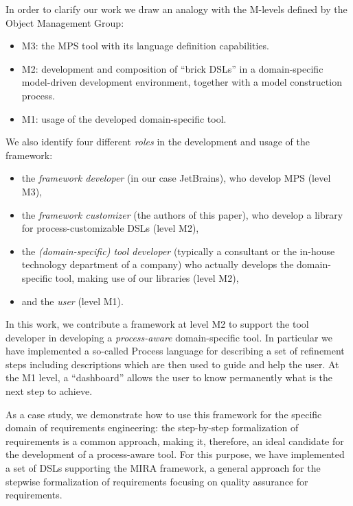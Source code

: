 In order to clarify our work we draw an analogy with the M-levels defined by the Object Management Group:
\vspace{-.1cm}
\begin{itemize}
  \item M3: the MPS tool with its language definition capabilities.
  \item M2: development and composition of ``brick DSLs'' in a
  domain-specific model-driven development environment, together with a
  model construction process.
  \item M1: usage of the developed domain-specific tool.
\end{itemize}
We also identify four different \emph{roles} in the development and
usage of the framework:
\vspace{-.1cm}
\begin{itemize}
  \item the \emph{framework developer} (in our case JetBrains), who develop MPS
  (level M3),
  \item the \emph{framework customizer} (the authors of this paper), who develop
  a library for process-customizable DSLs (level M2),
  \item the \emph{(domain-specific) tool developer} 
    (typically a consultant or the in-house technology department of a company)
    who actually develops the domain-specific tool, making use of our libraries (level M2),
  \item and the \emph{user} (level M1).
\end{itemize}
\vspace{-.1cm}
In this work, we contribute a framework at level M2 to support the tool developer
in developing a \emph{process-aware} domain-specific tool.
In particular we have implemented a so-called \textsf{Process} language for
describing a set of refinement steps including descriptions which are then used to guide and help the user.
At the M1 level, a ``dashboard'' allows the user to know permanently what is the
next step to achieve.

As a case study, we demonstrate how to use this framework for the
specific domain of requirements engineering: the step-by-step formalization of requirements is a common approach,
making it, therefore, an ideal candidate for the development of a process-aware tool.
For this purpose, we have implemented a set of DSLs supporting the MIRA
\cite{MIRA13} framework, a general approach for the stepwise formalization of requirements
focusing on quality assurance for requirements.

